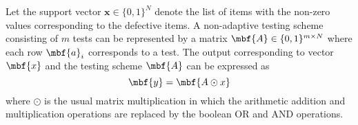 \documentclass[conference,twocolumn]{IEEEtran}
\DeclareMathOperator*{\bigORtxt}{\scalerel*{\text{$\vee$}}{\textstyle\sum}}
\begin{document}
{%

Let the support vector $\mathbf{x}\in\{0,1\}^{N}$ denote the list of items with the non-zero values corresponding to the defective items. A non-adaptive testing scheme consisting of $m$ tests can be represented by a matrix $\mbf{A}\in\{0,1\}^{m\times N}$ where each row $\mbf{a}_{i}$ corresponds to a test.
The output corresponding to vector $\mbf{x}$ and the testing scheme $\mbf{A}$ can be expressed as
\begin{equation*}
\mbf{y}=\mbf{A\odot x}
\end{equation*}
where $\odot$ is the usual matrix multiplication in which the arithmetic addition and multiplication operations are replaced by the boolean OR and AND operations.

%
}
\end{document}
